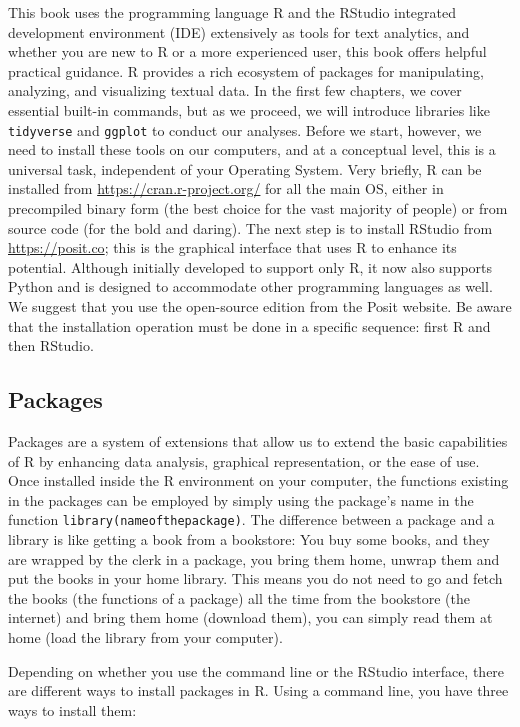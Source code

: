 This book uses the programming language R and the RStudio integrated development environment (IDE) extensively as tools for text analytics, and whether you are new to R or a more experienced user, this book offers helpful practical guidance. R provides a rich ecosystem of packages for manipulating, analyzing, and visualizing textual data. In the first few chapters, we cover essential built-in commands, but as we proceed, we will introduce libraries like \texttt{tidyverse} and \texttt{ggplot} to conduct our analyses. Before we start, however, we need to install these tools on our computers, and at a conceptual level, this is a universal task, independent of your Operating System. Very briefly, R can be installed from \url{https://cran.r-project.org/} for all the main OS, either in precompiled binary form (the best choice for the vast majority of people) or from source code (for the bold and daring). The next step is to install RStudio from \url{https://posit.co}; this is the graphical interface that uses R to enhance its potential. Although initially developed to support only R, it now also supports Python and is designed to accommodate other programming languages as well. We suggest that you use the open-source edition from the Posit website. Be aware that the installation operation must be done in a specific sequence: first R and then RStudio.

\subsection{Packages}\label{packages}

Packages are a system of extensions that allow us to extend the basic capabilities of R by enhancing data analysis, graphical representation, or the ease of use. Once installed inside the R environment on your computer, the functions existing in the packages can be employed by simply using the package's name in the function \texttt{library(nameofthepackage)}. The difference between a package and a library is like getting a book from a bookstore: You buy some books, and they are wrapped by the clerk in a package, you bring them home, unwrap them and put the books in your home library. This means you do not need to go and fetch the books (the functions of a package) all the time from the bookstore (the internet) and bring them home (download them), you can simply read them at home (load the library from your computer).

Depending on whether you use the command line or the RStudio interface, there are different ways to install packages in R. Using a command line, you have three ways to install them:

